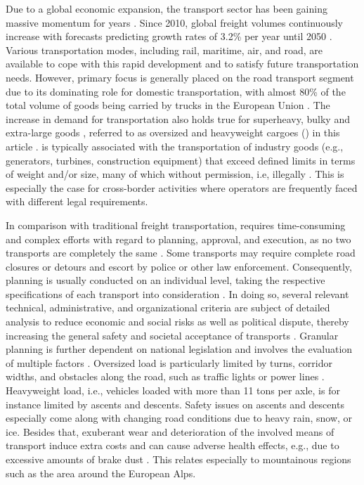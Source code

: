 
Due to a global economic expansion, the transport sector has been gaining massive momentum for years \cite{gungor2018detect}.
Since 2010, global freight volumes continuously increase with forecasts predicting growth rates of 3.2\% per year until 2050 \cite{figura2020preferences, InternationalTransportForum}.
Various transportation modes, including rail, maritime, air, and road, are available to cope with this rapid development and to satisfy future transportation needs.
However, primary focus is generally placed on the road transport segment due to its dominating role for domestic transportation, with almost 80\% of the total volume of goods being carried by trucks in the European Union \cite{Eurostat}.
The increase in demand for transportation also holds true for superheavy, bulky and extra-large goods \cite{gavrilova2021analysis}, referred to as oversized and heavyweight cargoes (\ohc) in this article \cite{Luo.2021}.
\ohc is typically associated with the transportation of industry goods (e.g., generators, turbines, construction equipment) that exceed defined limits in terms of weight and/or size, many of which without permission, i.e, illegally \cite{fiorillo2016minimizing}. This is especially the case for cross-border activities where operators are frequently faced with different legal requirements.
\par In comparison with traditional freight transportation, \ohc requires time-consuming and complex efforts with regard to planning, approval, and execution, as no two \ohc transports are completely the same \cite{Wolnowska.2019}.
Some \ohc transports may require complete road closures or detours and escort by police or other law enforcement.
Consequently, planning is usually conducted on an individual level, taking the respective specifications of each \ohc transport into consideration \cite{Bazaras.2013}.
In doing so, several relevant technical, administrative, and organizational criteria are subject of detailed analysis to reduce economic and social risks as well as political dispute, thereby increasing the general safety and societal acceptance of \ohc transports \cite{Palsaitis.2012}.
Granular planning is further dependent on national legislation and involves the evaluation of multiple factors \cite{zhu2014vehicle}. Oversized load is particularly limited by turns, corridor widths, and obstacles along the road, such as traffic lights or power lines \cite{PETRASKA.2018, arentze2012context}. Heavyweight load, i.e., vehicles loaded with more than 11 tons per axle, is for instance limited by ascents and descents. Safety issues on ascents and descents especially come along with changing road conditions due to heavy rain, snow, or ice. Besides that, exuberant wear and deterioration of the involved means of transport induce extra costs and can cause adverse health effects, e.g., due to excessive amounts of brake dust \cite{Gerlofs2019}. This relates especially to mountainous regions such as the area around the European Alps. 
